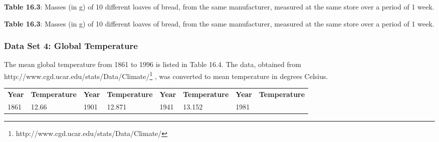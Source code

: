 \begin{description}[noitemsep]
\begin{description}[noitemsep]
\begin{table}[H]
\begin{center}
\begin{xtabular}[t]{|l|l|l|l|l|l|l|}
    \end{xtabular}
      \end{center}
    \begin{center}{\small\bfseries Table 16.3}: Masses (in g) of 10 different loaves of bread, from the same manufacturer, measured at the same store over a period of 1 week.\end{center}
    \begin{caption}{\small\bfseries Table 16.3}: Masses (in g) of 10 different loaves of bread, from the same manufacturer, measured at the same store over a period of 1 week.\end{caption}
\end{table}
    \par
      \label{m39403*uid30}
            \subsubsection{ Data Set 4: Global Temperature}
            \nopagebreak
            \label{m39403*id203994}The mean global temperature from 1861 to 1996 is listed in Table 16.4. The data, obtained from http://www.cgd.ucar.edu/stats/Data/Climate/\footnote{http://www.cgd.ucar.edu/stats/Data/Climate/}
        , was converted to mean temperature in degrees Celsius.\par 
          \begin{table}[H]
        \begin{center}
      \label{m39403*eip-685}
    \noindent
      \tablelasttail{}
      \begin{xtabular}[t]{|l|l|l|l|l|l|l|l|}\hline
        \textbf{	Year}	 &
        	\textbf{Temperature}		 &
        	\textbf{Year}		 &
        \textbf{	Temperature}		 &
        \textbf{	Year}		 &
        	\textbf{Temperature}		 &
        	\textbf{Year}		 &
        	\textbf{Temperature}		%
     \tabularnewline{}
        	1861	 &
        	12.66	 &
        	1901	 &
        	12.871	 &
        	1941	 &
        	13.152	 &
        	1981	 &

\end{xtabular}
\end{center}
\end{table}
\end{description}
\end{description}
